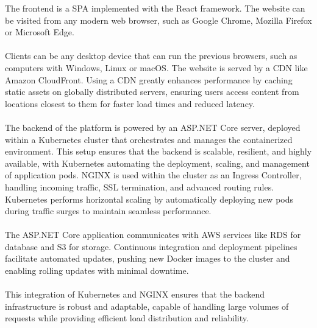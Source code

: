 The frontend is a SPA implemented with the React framework. The website can be visited from any modern web browser, such as Google Chrome, Mozilla Firefox or Microsoft Edge. \\ \\
Clients can be any desktop device that can run the previous browsers, such as computers with Windows, Linux or macOS.
The website is served by a CDN like Amazon CloudFront.
Using a CDN greatly enhances performance by caching static assets on globally distributed servers, ensuring users access content from locations closest to them for faster load times and reduced latency. \\ \\
The backend of the platform is powered by an ASP.NET Core server, deployed within a Kubernetes cluster that orchestrates and manages the containerized environment. This setup ensures that the backend is scalable, resilient, and highly available, with Kubernetes automating the deployment, scaling, and management of application pods. NGINX is used within the cluster as an Ingress Controller, handling incoming traffic, SSL termination, and advanced routing rules. Kubernetes performs horizontal scaling by automatically deploying new pods during traffic surges to maintain seamless performance.\\ \\
The ASP.NET Core application communicates with AWS services like RDS for database and S3 for storage. Continuous integration and deployment pipelines facilitate automated updates, pushing new Docker images to the cluster and enabling rolling updates with minimal downtime.\\ \\
This integration of Kubernetes and NGINX ensures that the backend infrastructure is robust and adaptable, capable of handling large volumes of requests while providing efficient load distribution and reliability.

